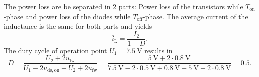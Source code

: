 
\begin{solutionblock}
    The power loss are be separated in 2 parts: Power loss of the transistors while $T_\mathrm{on}$-phase and power loss of the diodes while $T_\mathrm{off}$-phase.
    The average current of the inductance is the same for both parts and yields
    \begin{equation*}
        \overline{i}_\mathrm{L} = \frac{I_\mathrm{2}}{1-D}.
    \end{equation*}
    The duty cycle of operation point $U_\mathrm{1}=\SI{7.5}{\volt}$ results in
    \begin{equation*}
        D = \frac{U_\mathrm{2}+2u_\mathrm{fw}}{U_\mathrm{1}-2u_\mathrm{ds,on}+U_\mathrm{2}+2u_\mathrm{fw}}
        = \frac{\SI{5}{\volt}+ 2 \cdot \SI{0.8}{\volt}}{\SI{7.5}{\volt} - 2 \cdot \SI{0.5}{\volt}+\SI{0.8}{\volt + \SI{5}{\volt}+ 2 \cdot \SI{0.8}{\volt}}}
        = 0.5.
    \end{equation*}


\end{solutionblock}
